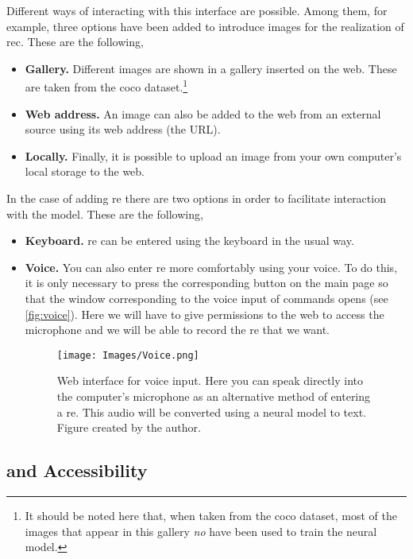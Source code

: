 Different ways of interacting with this interface are possible. Among them, for
example, three options have been added to introduce images for the realization
of \gls{rec}. These are the following,
\begin{itemize}
  \item \textbf{Gallery.} Different images are shown in a gallery inserted on
  the web. These are taken from the \gls{coco} dataset.\footnote{It should be
    noted here that, when taken from the \gls{coco} dataset, most of the images
    that appear in this gallery \emph{no} have been used to train the neural
    model.}
  \item \textbf{Web address.} An image can also be added to the web from an
  external source using its web address (the URL).
  \item \textbf{Locally.} Finally, it is possible to upload an image from your
  own computer's local storage to the web.
\end{itemize}

In the case of adding \gls{re} there are two options in order to facilitate
interaction with the model. These are the following,
\begin{itemize}
  \item \textbf{Keyboard.} \gls{re} can be entered using the keyboard in the
  usual way.
  \item \textbf{Voice.} You can also enter \gls{re} more comfortably using your
  voice. To do this, it is only necessary to press the corresponding button on
  the main page so that the window corresponding to the voice input of commands
  opens (see \vref{fig:voice}). Here we will have to give permissions to the
  web to access the microphone and we will be able to record the \gls{re} that
  we want.
  \begin{figure}[ht]
    \centering
    \texttt{[image: Images/Voice.png]}
    \caption[Web interface for voice input]{Web interface for voice input. Here
      you can speak directly into the computer's microphone as an alternative
      method of entering a \gls{re}. This audio will be converted using a
      neural model to text. Figure created by the author.}\label{fig:voice}
  \end{figure}
\end{itemize}


\subsection{ and Accessibility}%

